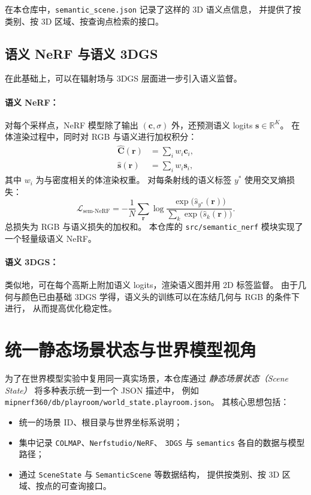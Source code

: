 \documentclass[12pt]{ctexart}
\begin{document}
在本仓库中，\texttt{semantic\_scene.json} 记录了这样的 3D 语义点信息，
并提供了按类别、按 3D 区域、按查询点检索的接口。

\subsection{语义 NeRF 与语义 3DGS}

在此基础上，可以在辐射场与 3DGS 层面进一步引入语义监督。

\paragraph{语义 NeRF：}
对每个采样点，NeRF 模型除了输出 $(\bm{c},\sigma)$ 外，还预测语义 logits $\bm{s}\in\mathbb{R}^K$。
在体渲染过程中，同时对 RGB 与语义进行加权积分：
\begin{align}
  \hat{\bm{C}}(\bm{r}) &= \sum_i w_i \bm{c}_i, \\
  \hat{\bm{s}}(\bm{r}) &= \sum_i w_i \bm{s}_i,
\end{align}
其中 $w_i$ 为与密度相关的体渲染权重。
对每条射线的语义标签 $y^\ast$ 使用交叉熵损失：
\begin{equation}
  \mathcal{L}_\text{sem-NeRF}
  =
  - \frac{1}{N}
    \sum_{\bm{r}}
    \log
    \frac{\exp\bigl(\hat{s}_{y^\ast}(\bm{r})\bigr)}
         {\sum_k \exp\bigl(\hat{s}_k(\bm{r})\bigr)}.
\end{equation}
总损失为 RGB 与语义损失的加权和。
本仓库的 \texttt{src/semantic\_nerf} 模块实现了一个轻量级语义 NeRF。

\paragraph{语义 3DGS：}
类似地，可在每个高斯上附加语义 logits，渲染语义图并用 2D 标签监督。
由于几何与颜色已由基础 3DGS 学得，语义头的训练可以在冻结几何与 RGB 的条件下进行，
从而提高优化稳定性。

\section{统一静态场景状态与世界模型视角}

为了在世界模型实验中复用同一真实场景，本仓库通过
\emph{静态场景状态（Scene State）} 将多种表示统一到一个 JSON 描述中，
例如 \texttt{mipnerf360/db/playroom/world\_state.playroom.json}。
其核心思想包括：
\begin{itemize}
  \item 统一的场景 ID、根目录与世界坐标系说明；
  \item 集中记录 \texttt{COLMAP}、\texttt{Nerfstudio/NeRF}、
        \texttt{3DGS} 与 \texttt{semantics} 各自的数据与模型路径；
  \item 通过 \texttt{SceneState} 与 \texttt{SemanticScene} 等数据结构，
        提供按类别、按 3D 区域、按点的可查询接口。
\end{itemize}
\end{document}
